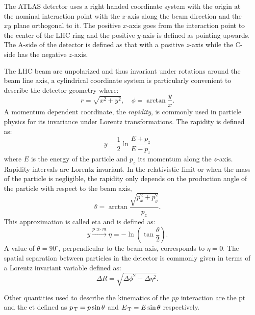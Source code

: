 The ATLAS detector uses a right handed coordinate system with the origin at the
nominal interaction point with the $z$-axis along the beam direction and the
$xy$ plane orthogonal to it. The positive $x$-axis goes from the interaction
point to the center of the LHC ring and the positive $y$-axis is defined as
pointing upwards. The A-side of the detector is defined as that with a positive
$z$-axis while the C-side has the negative $z$-axis.

The LHC beam are unpolarized and thus invariant under rotations around the beam
line axis, a cylindrical coordinate system is particularly convenient to
describe the detector geometry where:
\begin{equation}
  \label{eq:57}
  r = \sqrt{x^2 + y^2}, \quad \phi = \arctan \frac{y}{x}.
\end{equation}
A momentum dependent coordinate, the \emph{rapidity}, is commonly used in
particle physics for its invariance under Lorentz transformations. The rapidity
is defined as:
\begin{equation}
  \label{eq:58}
  y = \frac{1}{2} \ln \frac{E + p_z}{E - p_z}
\end{equation}
where $E$ is the energy of the particle and $p_z$ its momentum along the
$z$-axis. Rapidity intervals are Lorentz invariant. In the relativistic limit or
when the mass of the particle is negligible, the rapidity only depends on the
production angle of the particle with respect to the beam axis,
\begin{equation}
  \label{eq:59}
  \theta = \arctan \frac{\sqrt{p_x^2 + p_y^2}}{p_z}.
\end{equation}
This approximation is called \gls{eta} and is defined as:
\begin{equation}
  \label{eq:60}
  y \xrightarrow{p \gg m} \eta = - \ln \left( \tan \frac{\theta}{2} \right).
\end{equation}
A value of $\theta = 90^{\circ}$, perpendicular to the beam axis, corresponds to
$\eta = 0$. The spatial separation between particles in the detector is commonly
given in terms of a Lorentz invariant variable defined as:
\begin{equation}
  \label{eq:61}
  \Delta R = \sqrt{\Delta \phi^2 + \Delta \eta^2}.
\end{equation}

Other quantities used to describe the kinematics of the $pp$ interaction are the
\gls{pt} and the \gls{et} defined as $p_\mathrm{\, T} = p \sin \theta$ and
$E_\mathrm{\, T} = E \sin \theta$ respectively.
